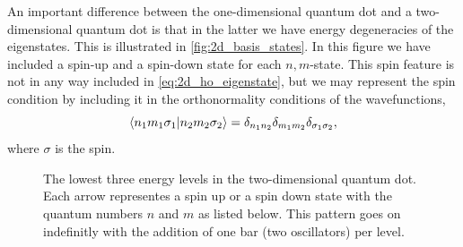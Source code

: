An important difference between the one-dimensional quantum dot and a two-dimensional 
quantum dot is that in the latter we have energy degeneracies of the eigenstates.
This is illustrated in \autoref{fig:2d_basis_states}. In this figure we have included 
a spin-up and a spin-down state for each $n,m$-state. This spin feature is not in any way 
included in \autoref{eq:2d_ho_eigenstate}, but we may represent the spin condition by
including it in the orthonormality conditions of the wavefunctions,
\begin{equation}
    \braket{n_1m_1\sigma_1}{n_2m_2\sigma_2} 
    = \delta_{n_1n_2}\delta_{m_1m_2}\delta_{\sigma_1\sigma_2},
\end{equation}
where $\sigma$ is the spin.

\begin{figure}
    \begin{center}
    \end{center}
    \caption{The
    lowest three energy levels in the two-dimensional quantum dot.
    Each arrow representes a spin up or a spin down state with the
    quantum numbers $n$ and $m$ as listed below. This pattern goes
    on indefinitly with the addition of one bar (two oscillators)
    per level.}
    \label{fig:2d_basis_states}
\end{figure}

